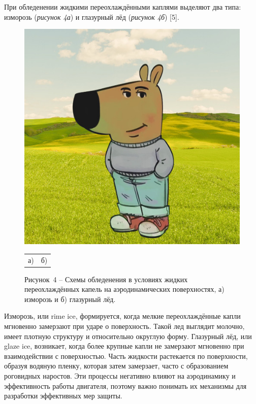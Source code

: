 При обледенении жидкими переохлаждёнными каплями выделяют два типа: изморозь (\textit{рисунок 4а}) и глазурный лёд (\textit{рисунок 4б}) [5].

\begin{figure}[H]
	\centering
	\includegraphics[width=\textwidth]{figures/chill-guy.jpeg}
	\vspace{0.5em}
	\begin{tabular}{@{}p{}@{}p{}@{}}
		\centering а) & \centering б) \\
	\end{tabular}
	
	\caption*{Рисунок~4 – Схемы обледенения в условиях жидких переохлаждённых капель на аэродинамических поверхностях, а) изморозь и б) глазурный лёд.}
	\label{fig:-2}
\end{figure}

Изморозь, или rime ice, формируется, когда мелкие переохлаждённые капли мгновенно замерзают при ударе о поверхность. Такой лед выглядит молочно, имеет плотную структуру и относительно округлую форму.
Глазурный лёд, или glaze ice, возникает, когда более крупные капли не замерзают мгновенно при взаимодействии с поверхностью. Часть жидкости растекается по поверхности, образуя водяную пленку, которая затем замерзает, часто с образованием роговидных наростов. Эти процессы негативно влияют на аэродинамику и эффективность работы двигателя, поэтому важно понимать их механизмы для разработки эффективных мер защиты.


